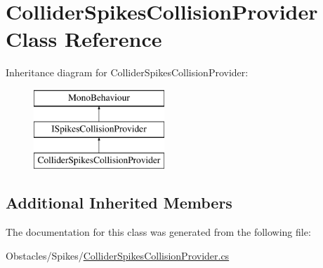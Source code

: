 \hypertarget{class_collider_spikes_collision_provider}{}\section{Collider\+Spikes\+Collision\+Provider Class Reference}
\label{class_collider_spikes_collision_provider}
Inheritance diagram for Collider\+Spikes\+Collision\+Provider\+:\begin{figure}[H]
\begin{center}
\leavevmode
\includegraphics[height=3.000000cm]{class_collider_spikes_collision_provider}
\end{center}
\end{figure}
\subsection*{Additional Inherited Members}


The documentation for this class was generated from the following file\+:\begin{DoxyCompactItemize}
\item 
Obstacles/\+Spikes/\mbox{\hyperlink{_collider_spikes_collision_provider_8cs}{Collider\+Spikes\+Collision\+Provider.\+cs}}\end{DoxyCompactItemize}
